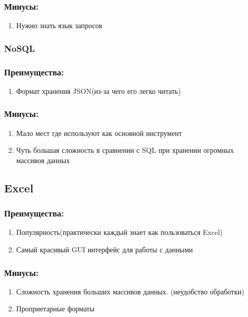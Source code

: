 \documentclass[a4paper, 12pt]{article}
\begin{document}
		\subsubsection{Минусы:}
		\begin{enumerate}
			\item Нужно знать язык запросов
		\end{enumerate}
	
	\subsubsection{NoSQL\cite{NoSQL}}
		\subsubsection{Преимущества:}
			\begin{enumerate}
				\item Формат хранения JSON\cite{JSON}(из-за чего его легко читать)
			\end{enumerate}
		\subsubsection{Минусы:}
		\begin{enumerate}
			\item Мало мест где используют как основной инструмент
			\item Чуть большая сложность в сравнении с SQL\cite{SQL} при хранении огромных массивов данных
		\end{enumerate}
	
	\subsection{Excel\cite{Excel}}
		\subsubsection{Преимущества:}
			\begin{enumerate}
				\item Популярность(практически каждый знает как пользоваться Excel\cite{Excel})
				\item Самый красивый GUI\cite{GUI} интерфейс для работы с данными
			\end{enumerate}
		\subsubsection{Минусы:}
			\begin{enumerate}
				\item Сложность хранения больших массивов данных. (неудобство обработки)
				\item Проприетарные форматы
			\end{enumerate}
	
\end{document}
